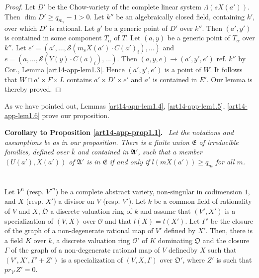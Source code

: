 \begin{proof}
Let $D'$ be the Chow-variety of the complete linear system $\Lambda(sX(a'))$. Then $\dim D'\geq q_{m_{s}}-1>0$. Let $k''$ be an algebraically closed field, containing $k'$, over which $D'$ is rational. Let $y'$ be a generic point of $D'$ over $k''$. Then $(a',y')$ is contained in some component $T_{\alpha}$ of $T$. Let $(a,y)$ be a generic point of $T_{\alpha}$ over $k''$. Let $e'=(a',\ldots,\mathscr{S}(m_{s}X(a')\cdot C(a')_{i}),\ldots)$ and $e=(a,\ldots,\mathscr{S}(Y(y)\cdot C(a)_{i}),\ldots )$. Then $(a,y,e)\to (a',y',e')$ ref. $k''$ by Cor., Lemma \ref{art14-app-lem1.3}. Hence $(a',y',e')$ is a point of $W$. It follows that $W\cap a'\times F\times L$ contains $a'\times D'\times e'$ and $a'$ is contained in $E'$. Our lemma is thereby proved.
\end{proof}

As we have pointed out, Lemmas \ref{art14-app-lem1.4}, \ref{art14-app-lem1.5}, \ref{art14-app-lem1.6} prove our proposition.

\medskip
\noindent
{\bf Corollary to Proposition \ref{art14-app-prop1.1}.}~ {\em Let the notations and assumptions be as in our proposition. There is a finite union $\mathfrak{E}$ of irreducible families, defined over $\overline{k}$ and contained in $\mathfrak{A}'$, such that a member $(U(a'),X(a'))$ of $\mathfrak{A}'$ is in $\mathfrak{E}$ if and only if $l(mX(a'))\geq q_{m}$ for all $m$.}

\section{}\label{art14-app-sec2}

\begin{subprop}\label{art14-app-prop2.1}
Let $V^{n}$ (resp. ${V'}^{n}$) be a complete abstract variety, non-singular in codimension $1$, and $X$ (resp. $X'$) a divisor on $V$ (resp. $V'$). Let $k$ be a common field of rationality of $V$ and $X$, $\mathfrak{O}$ a discrete valuation ring of $k$ and assume that $(V',X')$ is a specialization of $(V,X)$ over $\mathcal{O}$ and that $l(X)=l(X')$. Let $\Gamma'$ be the closure of the graph of a non-degenerate rational map of $V'$ defined by $X'$. Then, there is a field $K$ over $k$, a discrete valuation ring $\mathcal{O}'$ of $K$ dominating $\mathfrak{O}$ and the closure $\Gamma$ of the graph of a non-degenerate rational map of $V$ defined\pageoriginale by $X$ such that $(V',X',\Gamma'+Z')$ is a specialization of $(V,X,\Gamma)$ over $\mathfrak{O}'$, where $Z'$ is such that $pr_{V'}Z'=0$.
\end{subprop}

